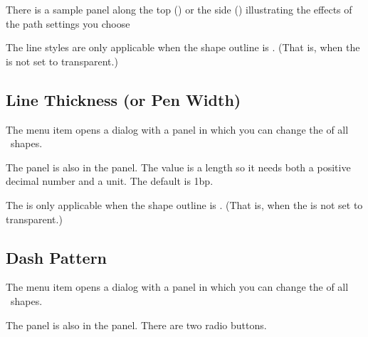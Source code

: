 There is a sample panel along the top ()
or the side () illustrating the
effects of the \gls{path} settings you choose

\begin{information}
The line styles are only applicable when the \gls{shape}
outline is . (That is, when 
the  is not set to \gls{transparent}.)
\end{information}

\subsection{Line Thickness (or Pen Width)}\label{sec:penwidth}


The  menu item opens a dialog
with a  panel in which
you can change the  
of all \selected\ \glspl{shape}.


The  panel is also in the 
 panel. The value is a length so it needs
both a positive decimal number and a unit. The default is 1\gls{bp}.

\begin{information}
The  is only applicable when the \gls{shape}
outline is . (That is, when 
the  is not set to \gls{transparent}.)
\end{information}

\subsection{Dash Pattern}\label{sec:dashpattern}


The  menu item opens a dialog
with a  panel in which
you can change the  
of all \selected\ \glspl{shape}.


The  panel is also in the 
 panel. There are two radio buttons.


